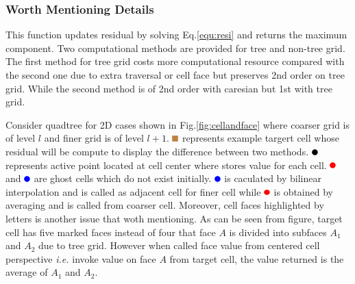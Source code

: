 \documentclass[a4paper]{article}
\newcommand{\target}{\tikz \fill[brown] (2pt,2pt) rectangle (8pt,8pt);}
\newcommand{\activetest}{\tikz \fill[black] (3pt,3pt) circle (3pt);}
\newcommand{\prolong}{\tikz \fill[blue] (3pt,3pt) circle (3pt);}
\newcommand{\rest}{\tikz \fill[red] (3pt,3pt) circle (3pt);}
\begin{document}
\subsubsection{Worth Mentioning Details}
This function updates residual by solving Eq.\ref{equ:resi} and returns the maximum component. Two computational methods are provided for tree and non-tree grid. The first method for tree grid costs more computational resource compared with the second one due to extra traversal or cell face but preserves 2nd order on tree grid. While the second method is of 2nd order with caresian but 1st with tree grid.\par
Consider quadtree for 2D cases shown in Fig.\ref{fig:cellandface} where coarser grid is of level $l$ and finer grid is of level $l+1$. $\target$ represents example targert cell whose residual will be compute to display the difference between two methods. $\activetest$ represents active point located at cell center where stores value for each cell. $\rest$ and $\prolong$ are ghost cells which do not exist initially. $\prolong$ is caculated by bilinear interpolation and is called as adjacent cell for finer cell while $\rest$ is obtained by averaging and is called from coarser cell. Moreover, cell faces highlighted by letters is another issue that woth mentioning. As can be seen from figure, target cell has five marked faces instead of four that face $A$ is divided into subfaces $A_1$ and $A_2$ due to tree grid. However when called face value from centered cell perspective \emph{i.e.} invoke value on face $A$ from target cell, the value returned is the average of $A_1$ and $A_2$. 
\end{document}
